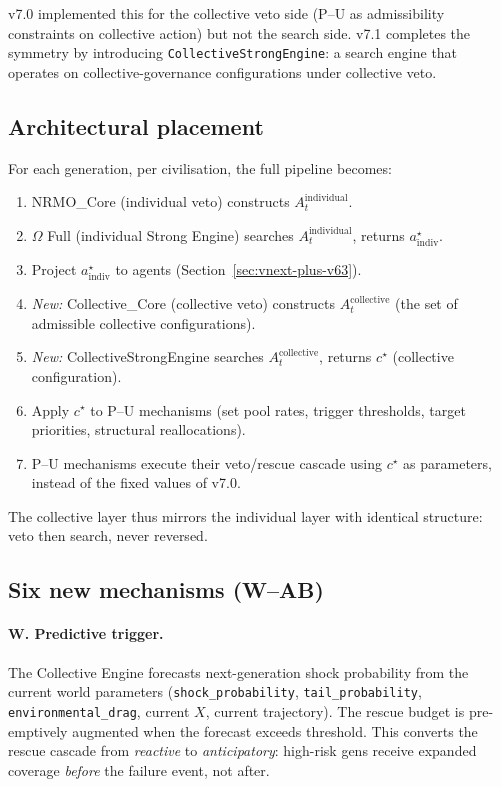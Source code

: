 v7.0 implemented this for the collective veto side (P--U as
admissibility constraints on collective action) but not the search
side. v7.1 completes the symmetry by introducing
\texttt{CollectiveStrongEngine}: a search engine that operates on
collective-governance configurations under collective veto.

\subsection{Architectural placement}

For each generation, per civilisation, the full pipeline becomes:

\begin{enumerate}
\item NRMO\_Core (individual veto) constructs
  $A_t^{\text{individual}}$.
\item $\Omega$ Full (individual Strong Engine) searches
  $A_t^{\text{individual}}$, returns $a^\star_{\text{indiv}}$.
\item Project $a^\star_{\text{indiv}}$ to agents
  (Section~\ref{sec:vnext-plus-v63}).
\item \emph{New:} Collective\_Core (collective veto) constructs
  $A_t^{\text{collective}}$ (the set of admissible collective
  configurations).
\item \emph{New:} CollectiveStrongEngine searches
  $A_t^{\text{collective}}$, returns $c^\star$ (collective
  configuration).
\item Apply $c^\star$ to P--U mechanisms (set pool rates, trigger
  thresholds, target priorities, structural reallocations).
\item P--U mechanisms execute their veto/rescue cascade using
  $c^\star$ as parameters, instead of the fixed values of v7.0.
\end{enumerate}

The collective layer thus mirrors the individual layer with
identical structure: veto then search, never reversed.

\subsection{Six new mechanisms (W--AB)}

\paragraph{W. Predictive trigger.}
The Collective Engine forecasts next-generation shock probability
from the current world parameters
(\texttt{shock\_probability}, \texttt{tail\_probability},
\texttt{environmental\_drag}, current $X$, current trajectory).
The rescue budget is pre-emptively augmented when the forecast
exceeds threshold. This converts the rescue cascade from
\emph{reactive} to \emph{anticipatory}: high-risk gens receive
expanded coverage \emph{before} the failure event, not after.

